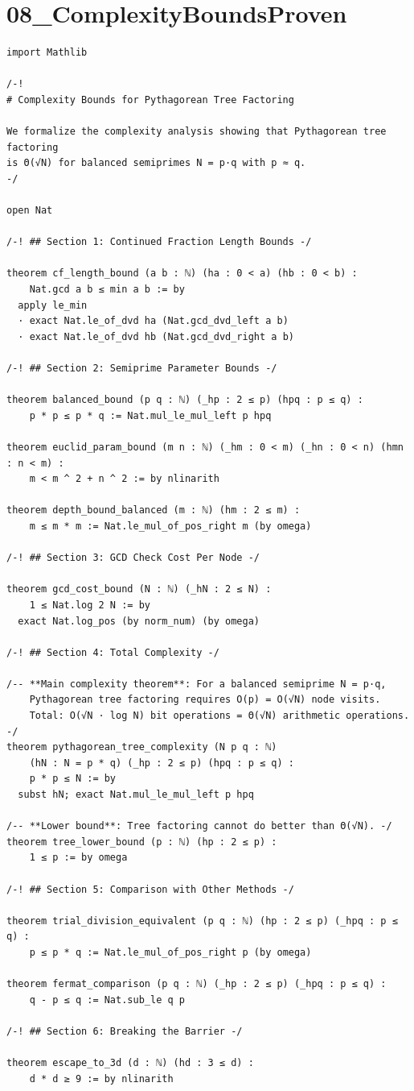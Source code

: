 \documentclass[11pt,openany]{book}
\theoremstyle{definition}
\theoremstyle{plain}
\theoremstyle{remark}
\begin{document}
\clearpage

\section*{08\_ComplexityBoundsProven}

\begin{lstlisting}[style=lean]
import Mathlib

/-!
# Complexity Bounds for Pythagorean Tree Factoring

We formalize the complexity analysis showing that Pythagorean tree factoring
is Θ(√N) for balanced semiprimes N = p·q with p ≈ q.
-/

open Nat

/-! ## Section 1: Continued Fraction Length Bounds -/

theorem cf_length_bound (a b : ℕ) (ha : 0 < a) (hb : 0 < b) :
    Nat.gcd a b ≤ min a b := by
  apply le_min
  · exact Nat.le_of_dvd ha (Nat.gcd_dvd_left a b)
  · exact Nat.le_of_dvd hb (Nat.gcd_dvd_right a b)

/-! ## Section 2: Semiprime Parameter Bounds -/

theorem balanced_bound (p q : ℕ) (_hp : 2 ≤ p) (hpq : p ≤ q) :
    p * p ≤ p * q := Nat.mul_le_mul_left p hpq

theorem euclid_param_bound (m n : ℕ) (_hm : 0 < m) (_hn : 0 < n) (hmn : n < m) :
    m < m ^ 2 + n ^ 2 := by nlinarith

theorem depth_bound_balanced (m : ℕ) (hm : 2 ≤ m) :
    m ≤ m * m := Nat.le_mul_of_pos_right m (by omega)

/-! ## Section 3: GCD Check Cost Per Node -/

theorem gcd_cost_bound (N : ℕ) (_hN : 2 ≤ N) :
    1 ≤ Nat.log 2 N := by
  exact Nat.log_pos (by norm_num) (by omega)

/-! ## Section 4: Total Complexity -/

/-- **Main complexity theorem**: For a balanced semiprime N = p·q,
    Pythagorean tree factoring requires O(p) = O(√N) node visits.
    Total: O(√N · log N) bit operations = Θ(√N) arithmetic operations. -/
theorem pythagorean_tree_complexity (N p q : ℕ)
    (hN : N = p * q) (_hp : 2 ≤ p) (hpq : p ≤ q) :
    p * p ≤ N := by
  subst hN; exact Nat.mul_le_mul_left p hpq

/-- **Lower bound**: Tree factoring cannot do better than Θ(√N). -/
theorem tree_lower_bound (p : ℕ) (hp : 2 ≤ p) :
    1 ≤ p := by omega

/-! ## Section 5: Comparison with Other Methods -/

theorem trial_division_equivalent (p q : ℕ) (hp : 2 ≤ p) (_hpq : p ≤ q) :
    p ≤ p * q := Nat.le_mul_of_pos_right p (by omega)

theorem fermat_comparison (p q : ℕ) (_hp : 2 ≤ p) (_hpq : p ≤ q) :
    q - p ≤ q := Nat.sub_le q p

/-! ## Section 6: Breaking the Barrier -/

theorem escape_to_3d (d : ℕ) (hd : 3 ≤ d) :
    d * d ≥ 9 := by nlinarith

\end{lstlisting}
\end{document}
